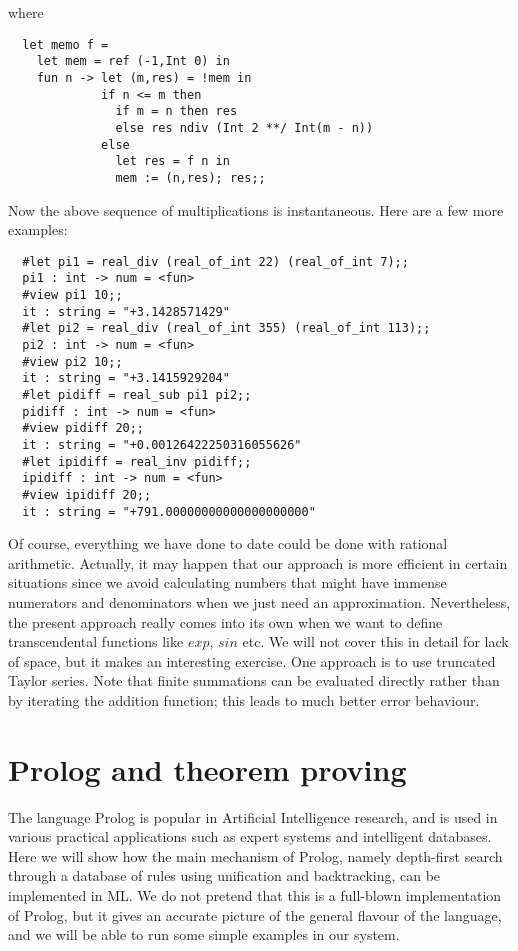 \noindent where

\begin{boxed}\begin{lstlisting}
  let memo f =
    let mem = ref (-1,Int 0) in
    fun n -> let (m,res) = !mem in
             if n <= m then
               if m = n then res
               else res ndiv (Int 2 **/ Int(m - n))
             else
               let res = f n in
               mem := (n,res); res;;
\end{lstlisting}\end{boxed}

Now the above sequence of multiplications is instantaneous. Here are a few more
examples:

\begin{boxed}\begin{verbatim}
  #let pi1 = real_div (real_of_int 22) (real_of_int 7);;
  pi1 : int -> num = <fun>
  #view pi1 10;;
  it : string = "+3.1428571429"
  #let pi2 = real_div (real_of_int 355) (real_of_int 113);;
  pi2 : int -> num = <fun>
  #view pi2 10;;
  it : string = "+3.1415929204"
  #let pidiff = real_sub pi1 pi2;;
  pidiff : int -> num = <fun>
  #view pidiff 20;;
  it : string = "+0.00126422250316055626"
  #let ipidiff = real_inv pidiff;;
  ipidiff : int -> num = <fun>
  #view ipidiff 20;;
  it : string = "+791.00000000000000000000"
\end{verbatim}\end{boxed}

Of course, everything we have done to date could be done with rational
arithmetic. Actually, it may happen that our approach is more efficient in
certain situations since we avoid calculating numbers that might have immense
numerators and denominators when we just need an approximation. Nevertheless,
the present approach really comes into its own when we want to define
transcendental functions like $exp$, $sin$ etc. We will not cover this in
detail for lack of space, but it makes an interesting exercise. One approach is
to use truncated Taylor series. Note that finite summations can be evaluated
directly rather than by iterating the addition function; this leads to much
better error behaviour.

\section{Prolog and theorem proving}

The language Prolog is popular in Artificial Intelligence research, and is used
in various practical applications such as expert systems and intelligent
databases. Here we will show how the main mechanism of Prolog, namely
depth-first search through a database of rules using unification and
backtracking, can be implemented in ML. We do not pretend that this is a
full-blown implementation of Prolog, but it gives an accurate picture of the
general flavour of the language, and we will be able to run some simple
examples in our system.


